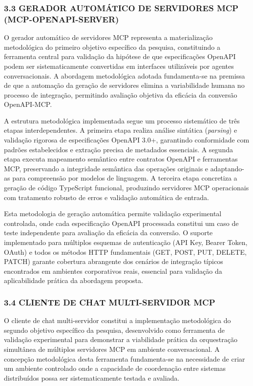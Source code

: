 \documentclass[
]{article}
\begin{document}
\subsubsection{3.3 GERADOR AUTOMÁTICO DE SERVIDORES MCP
(MCP-OPENAPI-SERVER)}\label{gerador-automuxe1tico-de-servidores-mcp-mcp-openapi-server}

O gerador automático de servidores MCP representa a materialização
metodológica do primeiro objetivo específico da pesquisa, constituindo a
ferramenta central para validação da hipótese de que especificações
OpenAPI podem ser sistematicamente convertidas em interfaces utilizáveis
por agentes conversacionais. A abordagem metodológica adotada
fundamenta-se na premissa de que a automação da geração de servidores
elimina a variabilidade humana no processo de integração, permitindo
avaliação objetiva da eficácia da conversão OpenAPI-MCP.

A estrutura metodológica implementada segue um processo sistemático de
três etapas interdependentes. A primeira etapa realiza análise sintática
(\emph{parsing}) e validação rigorosa de especificações OpenAPI 3.0+,
garantindo conformidade com padrões estabelecidos e extração precisa de
metadados essenciais. A segunda etapa executa mapeamento semântico entre
contratos OpenAPI e ferramentas MCP, preservando a integridade semântica
das operações originais e adaptando-as para compreensão por modelos de
linguagem. A terceira etapa concretiza a geração de código TypeScript
funcional, produzindo servidores MCP operacionais com tratamento robusto
de erros e validação automática de entrada.

Esta metodologia de geração automática permite validação experimental
controlada, onde cada especificação OpenAPI processada constitui um caso
de teste independente para avaliação da eficácia da conversão. O suporte
implementado para múltiplos esquemas de autenticação (API Key, Bearer
Token, OAuth) e todos os métodos HTTP fundamentais (GET, POST, PUT,
DELETE, PATCH) garante cobertura abrangente dos cenários de integração
típicos encontrados em ambientes corporativos reais, essencial para
validação da aplicabilidade prática da abordagem proposta.

\subsubsection{3.4 CLIENTE DE CHAT MULTI-SERVIDOR
MCP}\label{cliente-de-chat-multi-servidor-mcp}

O cliente de chat multi-servidor constitui a implementação metodológica
do segundo objetivo específico da pesquisa, desenvolvido como ferramenta
de validação experimental para demonstrar a viabilidade prática da
orquestração simultânea de múltiplos servidores MCP em ambiente
conversacional. A concepção metodológica desta ferramenta fundamenta-se
na necessidade de criar um ambiente controlado onde a capacidade de
coordenação entre sistemas distribuídos possa ser sistematicamente
testada e avaliada.
\end{document}
